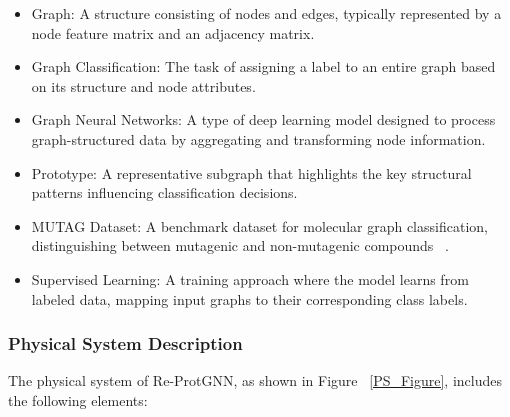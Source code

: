 \documentclass[12pt]{article}
\begin{document}
\begin{itemize}

\item Graph: A structure consisting of nodes and edges, typically represented by a node feature matrix and an adjacency matrix.
\item Graph Classification: The task of assigning a label to an entire graph based on its structure and node attributes.
\item Graph Neural Networks: A type of deep learning model designed to process graph-structured data by aggregating and transforming node information.
\item Prototype: A representative subgraph that highlights the key structural patterns influencing classification decisions.
\item MUTAG Dataset: A benchmark dataset for molecular graph classification, distinguishing between mutagenic and non-mutagenic compounds ~\cite{debnath1991structure}.
\item Supervised Learning: A training approach where the model learns from labeled data, mapping input graphs to their corresponding class labels.

\end{itemize}

\subsubsection{Physical System Description} \label{sec_phySystDescrip}

The physical system of Re-ProtGNN, as shown in Figure ~\ref{PS_Figure},
includes the following elements:
\end{document}
